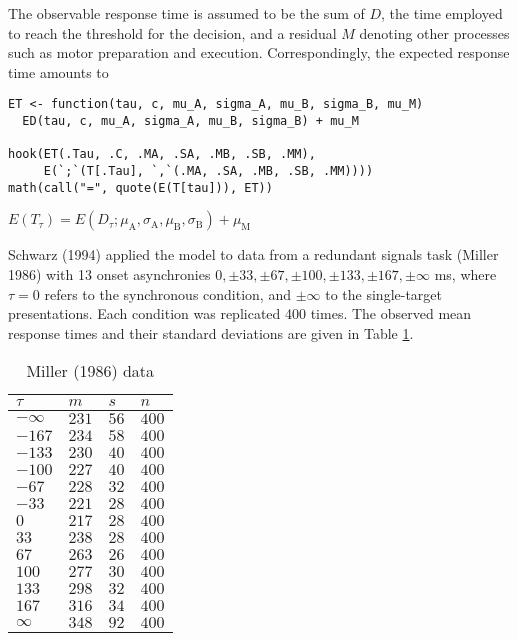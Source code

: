 The observable response time is assumed to be the sum of \(D\), the time
employed to reach the threshold for the decision, and a residual \(M\) denoting
other processes such as motor preparation and execution. Correspondingly, the
expected response time amounts to

\begin{verbatim}
ET <- function(tau, c, mu_A, sigma_A, mu_B, sigma_B, mu_M)
  ED(tau, c, mu_A, sigma_A, mu_B, sigma_B) + mu_M

hook(ET(.Tau, .C, .MA, .SA, .MB, .SB, .MM),
     E(`;`(T[.Tau], `,`(.MA, .SA, .MB, .SB, .MM))))
math(call("=", quote(E(T[tau])), ET))
\end{verbatim}

\({E{\left({T}_{\tau}\right)}}{=}{{E{\left({{D}_{\tau}}{;}{{{\mu}_{\mathrm{A}}}{{,}{{\sigma}_{\mathrm{A}}}{{,}{{\mu}_{\mathrm{B}}}{{,}{{\sigma}_{\mathrm{B}}}}}}}\right)}}{+}{{\mu}_{\mathrm{M}}}}\)

Schwarz (1994) applied the model to data from a redundant signals
task (Miller 1986) with 13 onset
asynchronies \(0, \pm33, \pm67, \pm100, \pm133, \pm167, \pm\infty\) ms,
where \(\tau = 0\) refers to the synchronous condition, and \(\pm\infty\) to the
single-target presentations. Each condition was replicated 400 times. The
observed mean response times and their standard deviations are given in
Table \ref{tab:miller-data}.

\begin{table}

\caption{\label{tab:miller-data}Miller (1986) data}
\centering
\begin{tabular}[t]{l|l|l|l}
\hline
\(\tau\) & \(m\) & \(s\) & \(n\)\\
\hline
${-}{\infty}$ & $231$ & $56$ & $400$\\
\hline
${-}{167}$ & $234$ & $58$ & $400$\\
\hline
${-}{133}$ & $230$ & $40$ & $400$\\
\hline
${-}{100}$ & $227$ & $40$ & $400$\\
\hline
${-}{67}$ & $228$ & $32$ & $400$\\
\hline
${-}{33}$ & $221$ & $28$ & $400$\\
\hline
$0$ & $217$ & $28$ & $400$\\
\hline
$33$ & $238$ & $28$ & $400$\\
\hline
$67$ & $263$ & $26$ & $400$\\
\hline
$100$ & $277$ & $30$ & $400$\\
\hline
$133$ & $298$ & $32$ & $400$\\
\hline
$167$ & $316$ & $34$ & $400$\\
\hline
$\infty$ & $348$ & $92$ & $400$\\
\hline
\end{tabular}
\end{table}

